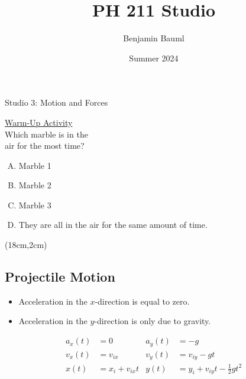 \documentclass[]{article}
\title{PH 211 Studio \Week}
\author{Benjamin Bauml}
\date{Summer 2024}
\begin{document}
\begin{TeacherMargin}

\end{TeacherMargin}
\begin{PresentSpace}
\begin{center}
	\huge Studio 3: Motion and Forces \\
	\vspace{1cm}
\end{center}
\underline{Warm-Up Activity} \\
Which marble is in the \\
air for the most time?
\begin{enumerate}[(A)]
	\item Marble 1
	\item Marble 2
	\item Marble 3
	\item They are all in the air for the same amount of time.
\end{enumerate}
\end{PresentSpace}
\begin{textblock*}{10cm}(18cm,2cm)
	\Large
\end{textblock*}\newpage
\begin{TeacherMargin}

\end{TeacherMargin}
\begin{PresentSpace}
\vspace{-10pt}
\section*{Projectile Motion}
\vspace{-10pt}
\begin{itemize}
	\item Acceleration in the $x$-direction is equal to zero.
	\item Acceleration in the $y$-direction is only due to gravity.
\end{itemize}
\begin{align*}
	a_{x}(t) & = 0 & a_{y}(t) & = -g \\
	v_{x}(t) & = v_{ix} & v_{y}(t) & = v_{iy} - gt \\
	x(t) & = x_{i} + v_{ix}t & y(t) & = y_{i} + v_{iy}t -\frac{1}{2}gt^{2}
\end{align*}
\end{PresentSpace}
\end{document}
